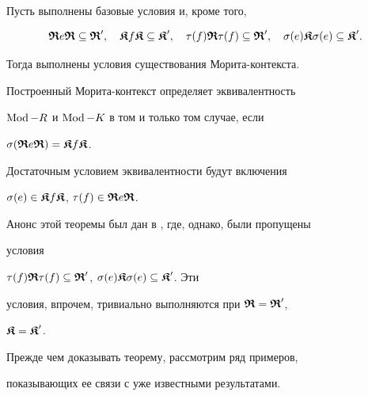 \begin{thm}


Пусть выполнены базовые условия и, кроме того,


$$


\R e \R \subseteq \R',\quad \K f \K \subseteq \K',\quad


\t(f) \R\t(f) \subseteq \R',\quad \s(e)\K\s(e)\subseteq \K'.


$$


Тогда выполнены условия существования Морита-контекста.


Построенный Морита-контекст определяет эквивалентность


$\operatorname{Mod} -R$ и $\operatorname{Mod} -K$ в том и только том случае, если


$\sigma(\boldsymbol{\frak R} e \boldsymbol{\frak R}) = \boldsymbol{\frak K} f \boldsymbol{\frak K}$.


Достаточным условием эквивалентности будут включения


$ \sigma(e) \in \boldsymbol{\frak K} f \boldsymbol{\frak K} $, $ \tau(f) \in \boldsymbol{\frak R} e \boldsymbol{\frak R} $.


\end{thm}





Анонс этой теоремы был дан в \cite{Tro}, где, однако, были пропущены


условия


$\tau(f) \boldsymbol{\frak R}\tau(f) \subseteq \boldsymbol{\frak R}'$, $\sigma(e)\boldsymbol{\frak K}\sigma(e)\subseteq \boldsymbol{\frak K}'$. Эти


условия, впрочем, тривиально выполняются при $\boldsymbol{\frak R}=\boldsymbol{\frak R}'$,


$\boldsymbol{\frak K}=\boldsymbol{\frak K}'$.








Прежде чем доказывать теорему, рассмотрим ряд примеров,


показывающих ее связи с уже известными результатами.





